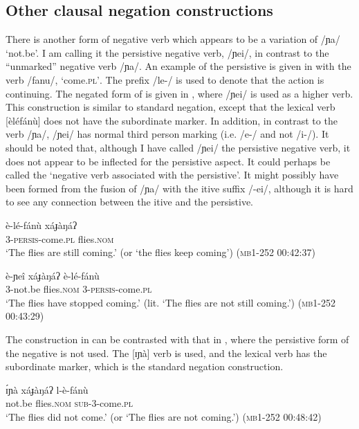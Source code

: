 \documentclass[output=paper,colorlinks,citecolor=brown,draftmode]{langscibook}
\begin{document}
\subsection{Other clausal negation constructions}
\label{sec:lop:2.6}
There is another form of negative verb which appears to be a variation of /ɲa/ ‘not.be'. I am calling it the persistive negative verb, /ɲei/, in contrast to the “unmarked” negative verb /ɲa/. An example of the persistive is given in  with the verb /fanu/, ‘come.\textsc{pl’}. The prefix /le-/ is used to denote that the action is continuing. The negated form of  is given in , where /ɲei/ is used as a higher verb. This construction is similar to standard negation, except that the lexical verb [èléfánù] does not have the subordinate marker. In addition, in contrast to the verb /ɲa/, /ɲei/ has normal third person marking (i.e. /e-/ and not /i-/). It should be noted that, although I have called /ɲei/ the persistive negative verb, it does not appear to be inflected for the persistive aspect. It could perhaps be called the ‘negative verb associated with the persistive’. It might possibly have been formed from the fusion of /ɲa/ with the itive suffix /-ei/, although it is hard to see any connection between the itive and the persistive.

\ea\label{ex:lop:67}
        \gll è-lé-fánù xáɟàŋáʔ \\ 
             3-\textsc{persis}{}-come.\textsc{pl} flies.\textsc{nom} \\
        \glt ‘The flies are still coming.' (or ‘the flies keep coming')    (\textsc{mb1-252} \textsc{00}:42:37)
\z

\ea\label{ex:lop:68}
        \gll è-ɲeî xáɟàŋáʔ  è-lé-fánù   \\ 
             3-not.be flies.\textsc{nom} 3-\textsc{persis}{}-come.\textsc{pl} \\
        \glt ‘The flies have stopped coming.' (lit. ‘The flies are not still coming.')    (\textsc{mb1-252} \textsc{00:}43:29)
\z

The construction in  can be contrasted with that in , where the persistive form of the negative is not used. The [ɪɲà] verb is used, and the lexical verb has the subordinate marker, which is the standard negation construction.

\ea\label{ex:lop:69}
        \gll ɪ́ɲà xáɟàŋáʔ  l-è-fánù   \\ 
             not.be flies.\textsc{nom} \textsc{sub}{}-3-come.\textsc{pl} \\
        \glt ‘The flies did not come.’ (or ‘The flies are not coming.’) (\textsc{mb1-252} \textsc{00}:48:42)
\z
\end{document}
